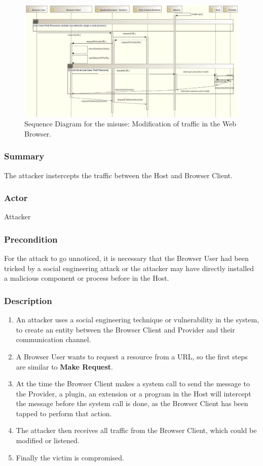 \documentclass{sig-alternate-05-2015}
\begin{document}
\begin{figure}[h!t]
  \centering
  \includegraphics[scale=0.52]{figures/patronMisuseSeq_v3.jpg}
  \caption{Sequence Diagram for the misuse: Modification of traffic in the Web Browser.}
  \label{fig:SeqMisuse}
\end{figure}

  
  \subsubsection*{Summary} The attacker instercepts the traffic between the Host and Browser Client.
  \subsubsection*{Actor} Attacker
  \subsubsection*{Precondition} For the attack to go unnoticed, it is necessary that the Browser User had been tricked by a social engineering attack or the attacker may have directly installed a malicious component or process before in the Host.

  \subsubsection*{Description}
      \begin{enumerate}
        \item An attacker uses a social engineering technique or vulnerability in the system, to create an entity between the Browser Client and Provider and their communication channel.
        \item A Browser User wants to request a resource from a URL, so the first steps are similar to \textbf{Make Request}.
        \item At the time the Browser Client makes a system call to send the message to the Provider, a plugin, an extension or a program in the Host will intercept the message before the system call is done, as the Browser Client has been tapped to perform that action.
        \item The attacker then receives all traffic from the Browser Client, which could be modified or listened.
        \item Finally the victim is compromised.
      \end{enumerate}
\end{document}
